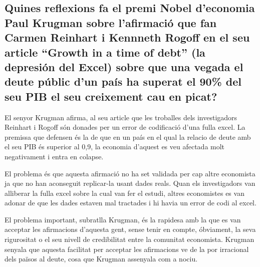 \subsection{Quines reflexions fa el premi Nobel d’economia Paul Krugman
sobre l’afirmació que fan Carmen Reinhart i Kennneth Rogoff en el seu 
article ``Growth in a time of debt'' (la depresión del Excel) sobre que
una vegada el deute públic d’un país ha superat el
90\% del seu PIB el seu creixement cau en picat?}

El senyor Krugman afirma, al seu article 
que les troballes dels investigadors Reinhart i Rogoff són donades per un
error de codificació d'una fulla excel. La premissa que defensen és la de
que en un país en el qual la relacio de deute amb el seu PIB és superior al
0,9, la economia d'aquest es veu afectada molt negativament i entra en 
colapse.

El problema és que aquesta afirmació no ha set validada per cap altre 
economista ja que no han aconseguit replicar-la usant dades reals. Quan
els investigadors van alliberar la fulla excel sobre la cual van fer el 
estudi, altres economistes es van adonar de que les dades estaven mal
tractades i hi havia un error de codi al excel.

El problema important, subratlla Krugman, és la rapidesa amb la que es van
acceptar les afirmacions d'aquesta gent, sense tenir en compte, óbviament,
la seva rigurositat o el seu nivell de credibilitat entre la comunitat 
economista. Krugman senyala que aquesta facilitat per acceptar les 
afirmacions ve de la por irracional dels països al deute, cosa que Krugman
assenyala com a nociu.
